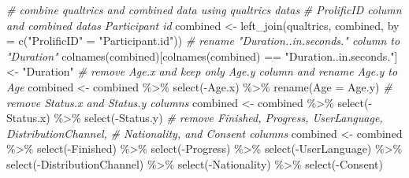 \documentclass[
]{article}
\newenvironment{Shaded}{\begin{snugshade}}{\end{snugshade}}
\newcommand{\AttributeTok}[1]{\textcolor[rgb]{0.77,0.63,0.00}{#1}}
\newcommand{\CommentTok}[1]{\textcolor[rgb]{0.56,0.35,0.01}{\textit{#1}}}
\newcommand{\FunctionTok}[1]{\textcolor[rgb]{0.00,0.00,0.00}{#1}}
\newcommand{\NormalTok}[1]{#1}
\newcommand{\OtherTok}[1]{\textcolor[rgb]{0.56,0.35,0.01}{#1}}
\newcommand{\SpecialCharTok}[1]{\textcolor[rgb]{0.00,0.00,0.00}{#1}}
\newcommand{\StringTok}[1]{\textcolor[rgb]{0.31,0.60,0.02}{#1}}
\begin{document}
\begin{Shaded}
\begin{Highlighting}[]
\CommentTok{\# combine qualtrics and combined data using qualtrics data\textquotesingle{}s}
\CommentTok{\#     ProlificID column and combined data\textquotesingle{}s Participant id}
\NormalTok{combined }\OtherTok{\textless{}{-}} \FunctionTok{left\_join}\NormalTok{(qualtrics, combined, }\AttributeTok{by =} \FunctionTok{c}\NormalTok{(}\StringTok{"ProlificID"} \OtherTok{=} \StringTok{"Participant.id"}\NormalTok{))}
\CommentTok{\# rename "Duration..in.seconds." column to "Duration"}
\FunctionTok{colnames}\NormalTok{(combined)[}\FunctionTok{colnames}\NormalTok{(combined) }\SpecialCharTok{==} \StringTok{"Duration..in.seconds."}\NormalTok{] }\OtherTok{\textless{}{-}} \StringTok{"Duration"}
\CommentTok{\# remove Age.x and keep only Age.y column and rename Age.y to Age}
\NormalTok{combined }\OtherTok{\textless{}{-}}\NormalTok{ combined }\SpecialCharTok{\%\textgreater{}\%}
  \FunctionTok{select}\NormalTok{(}\SpecialCharTok{{-}}\NormalTok{Age.x) }\SpecialCharTok{\%\textgreater{}\%}
  \FunctionTok{rename}\NormalTok{(}\AttributeTok{Age =}\NormalTok{ Age.y)}
\CommentTok{\# remove Status.x and Status.y columns}
\NormalTok{combined }\OtherTok{\textless{}{-}}\NormalTok{ combined }\SpecialCharTok{\%\textgreater{}\%}
  \FunctionTok{select}\NormalTok{(}\SpecialCharTok{{-}}\NormalTok{Status.x) }\SpecialCharTok{\%\textgreater{}\%}
  \FunctionTok{select}\NormalTok{(}\SpecialCharTok{{-}}\NormalTok{Status.y)}
\CommentTok{\# remove Finished, Progress, UserLanguage, DistributionChannel,}
\CommentTok{\# Nationality, and Consent columns}
\NormalTok{combined }\OtherTok{\textless{}{-}}\NormalTok{ combined }\SpecialCharTok{\%\textgreater{}\%}
  \FunctionTok{select}\NormalTok{(}\SpecialCharTok{{-}}\NormalTok{Finished) }\SpecialCharTok{\%\textgreater{}\%}
  \FunctionTok{select}\NormalTok{(}\SpecialCharTok{{-}}\NormalTok{Progress) }\SpecialCharTok{\%\textgreater{}\%}
  \FunctionTok{select}\NormalTok{(}\SpecialCharTok{{-}}\NormalTok{UserLanguage) }\SpecialCharTok{\%\textgreater{}\%}
  \FunctionTok{select}\NormalTok{(}\SpecialCharTok{{-}}\NormalTok{DistributionChannel) }\SpecialCharTok{\%\textgreater{}\%}
  \FunctionTok{select}\NormalTok{(}\SpecialCharTok{{-}}\NormalTok{Nationality) }\SpecialCharTok{\%\textgreater{}\%}
  \FunctionTok{select}\NormalTok{(}\SpecialCharTok{{-}}\NormalTok{Consent)}



\end{Highlighting}
\end{Shaded}
\end{document}
